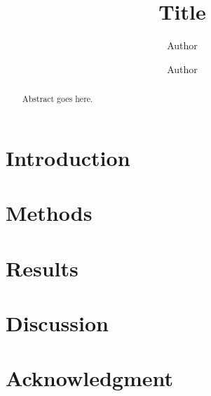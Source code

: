 \documentclass[10pt,a4paper]{article}
\title{Title}
\author[1]{Author}
\author[1]{Author}
\affil[1]{Department of ..., Institute of ...}
\date{}
\begin{document}
\hypersetup{
	,citecolor=blue
	,linkcolor=black
}
\maketitle
\begin{abstract}
	Abstract goes here.
\end{abstract}

\section{Introduction}

\section{Methods}

\section{Results}

\section{Discussion}

\section{Acknowledgment}



%

%
%
%

	
	
	
\end{document}
